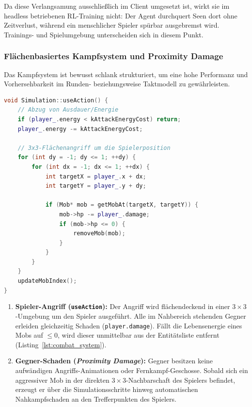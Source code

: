\documentclass[
  a4paper,
  11pt,
  twoside,
  BCOR=8mm,           %
  headings=big,
  numbers=noenddot,
  listof=totoc,       %
  captions=tableheading,
]{scrreprt}
\begin{document}
Da diese Verlangsamung ausschließlich im Client umgesetzt ist, wirkt sie im headless betriebenen RL-Training nicht: Der Agent durchquert Seen dort ohne Zeitverlust, während ein menschlicher Spieler spürbar ausgebremst wird. Trainings- und Spielumgebung unterscheiden sich in diesem Punkt.

\subsubsection{Flächenbasiertes Kampfsystem und Proximity Damage}
Das Kampfsystem ist bewusst schlank strukturiert, um eine hohe Performanz und Vorhersehbarkeit im Runden- beziehungsweise Taktmodell zu gewährleisten.

\begin{lstlisting}[language=C++, caption={Flächenangriff des Spielers und Schadensabwicklung in \texttt{simulation.cpp}}, label={lst:combat_system}]
void Simulation::useAction() {
    // Abzug von Ausdauer/Energie
    if (player_.energy < kAttackEnergyCost) return;
    player_.energy -= kAttackEnergyCost;

    // 3x3-Flächenangriff um die Spielerposition
    for (int dy = -1; dy <= 1; ++dy) {
        for (int dx = -1; dx <= 1; ++dx) {
            int targetX = player_.x + dx;
            int targetY = player_.y + dy;

            if (Mob* mob = getMobAt(targetX, targetY)) {
                mob->hp -= player_.damage;
                if (mob->hp <= 0) {
                    removeMob(mob);
                }
            }
        }
    }
    updateMobIndex();
}
\end{lstlisting}

\begin{enumerate}
    \item \textbf{Spieler-Angriff (\texttt{useAction}):} Der Angriff wird flächendeckend in einer $3 \times 3$-Umgebung um den Spieler ausgeführt. Alle im Nahbereich stehenden Gegner erleiden gleichzeitig Schaden (\texttt{player.damage}). Fällt die Lebensenergie eines Mobs auf $\le 0$, wird dieser unmittelbar aus der Entitätsliste entfernt (Listing~\ref{lst:combat_system}).
    \item \textbf{Gegner-Schaden (\textit{Proximity Damage}):} Gegner besitzen keine aufwändigen Angriffs-Animationen oder Fernkampf-Geschosse. Sobald sich ein aggressiver Mob in der direkten $3 \times 3$-Nachbarschaft des Spielers befindet, erzeugt er über die Simulationsschritte hinweg automatischen Nahkampfschaden an den Trefferpunkten des Spielers.
\end{enumerate}
\end{document}
